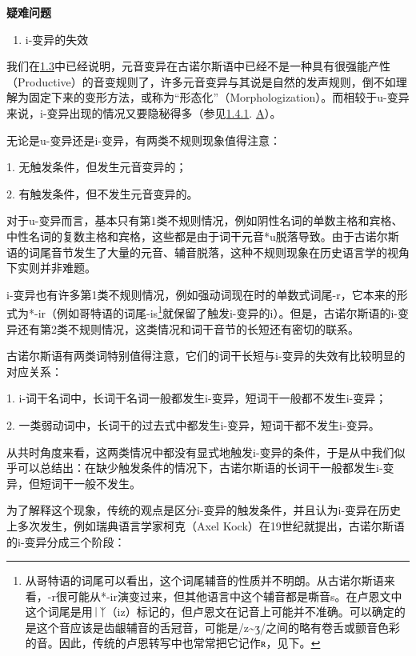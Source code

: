 \textbf{疑难问题}

\begin{enumerate}
  \def\labelenumi{\arabic{enumi})}
  \item
        i-变异的失效
\end{enumerate}

我们在\hyperref[ux53d8ux5143ux97f3]{1.3}中已经说明，元音变异在古诺尔斯语中已经不是一种具有很强能产性（Productive）的音变规则了，许多元音变异与其说是自然的发声规则，倒不如理解为固定下来的变形方法，或称为``形态化''（Morphologization）。而相较于u-变异来说，i-变异出现的情况又要隐秘得多（参见\hyperref[ux5143ux97f3ux7684ux97f3ux53d8]{1.4.1}.
\hyperref[_Ref117017033]{A}）。

无论是u-变异还是i-变异，有两类不规则现象值得注意：

1. 无触发条件，但发生元音变异的；

2. 有触发条件，但不发生元音变异的。

对于u-变异而言，基本只有第1类不规则情况，例如阴性名词的单数主格和宾格、中性名词的复数主格和宾格，这些都是由于词干元音*u脱落导致。由于古诺尔斯语的词尾音节发生了大量的元音、辅音脱落，这种不规则现象在历史语言学的视角下实则并非难题。

i-变异也有许多第1类不规则情况，例如强动词现在时的单数式词尾-r，它本来的形式为*-ir（例如哥特语的词尾-is\footnote{从哥特语的词尾可以看出，这个词尾辅音的性质并不明朗。从古诺尔斯语来看，-r很可能从*-ir演变过来，但其他语言中这个辅音都是嘶音s。在卢恩文中这个词尾是用ᛁᛉ（iz）标记的，但卢恩文在记音上可能并不准确。可以确定的是这个音应该是齿龈辅音的舌冠音，可能是/z\textasciitilde ʒ/之间的略有卷舌或颤音色彩的音。因此，传统的卢恩转写中也常常把它记作ʀ，见下。}就保留了触发i-变异的i）。但是，古诺尔斯语的i-变异还有第2类不规则情况，这类情况和词干音节的长短还有密切的联系。

古诺尔斯语有两类词特别值得注意，它们的词干长短与i-变异的失效有比较明显的对应关系：

1. i-词干名词中，长词干名词一般都发生i-变异，短词干一般都不发生i-变异；

2. 一类弱动词中，长词干的过去式中都发生i-变异，短词干都不发生i-变异。

从共时角度来看，这两类情况中都没有显式地触发i-变异的条件，于是从中我们似乎可以总结出：在缺少触发条件的情况下，古诺尔斯语的长词干一般都发生i-变异，但短词干一般不发生。

为了解释这个现象，传统的观点是区分i-变异的触发条件，并且认为i-变异在历史上多次发生，例如瑞典语言学家柯克（Axel
Kock）在19世纪就提出，古诺尔斯语的i-变异分成三个阶段：

